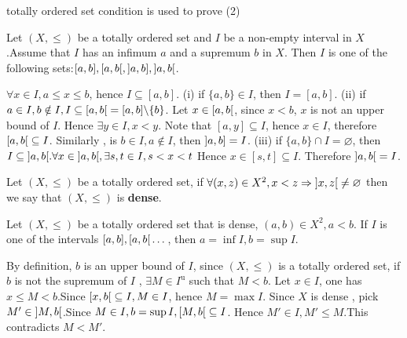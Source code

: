 \begin{remark}
    totally ordered set condition is used to prove (2)
\end{remark}
\begin{propositionenv}
   Let $(X, \le )$ be a totally ordered set and $I $ be a  non-empty interval in $X$  .Assume that $I$ has an infimum $a$ and a supremum $b$ in $X$. Then $I$ is one of the following sets:$[a, b], \interval[open right]{a}{b}, \interval[open left]{a}{b}, \interval[open]{a}{b}$.
\end{propositionenv}
\begin{proofenv}
    $\forall x\in I , a\le x\le b $, hence $I\subseteq [a, b]$.
    \newline
    (i) if $\{a, b\}\in I$,  then $I=[a, b]$.
    \newline
    (ii) if $a\in I,  b\notin I, I\subseteq\interval[open right]{a}{b}=[a, b]\backslash\{b\}$. Let $x\in \interval[open right]{a}{b}$,  since $x<b$,  $x$ is not an upper bound of $I$. Hence $\exists y\in I,  x<y$. Note that $[a, y]\subseteq I$,  hence $x\in I$,  therefore $\interval[open right]{a}{b}\subseteq I$. Similarly ,  is $b\in I, a\notin I$,  then $\interval[open left]{a}{b}=I$.
    \newline
    (iii) if $\{a, b\}\cap I=\varnothing$,  then $I\subseteq\interval[open]{a}{b} .\forall x\in \interval[open]{a}{b}, \exists s, t\in I, s<x<t$ Hence $x\in [s, t]\subseteq I$. Therefore $\interval[open]{a}{b}=I$.

\end{proofenv}
\begin{definitionenv}[Dense]
    Let $(X, \le )$ be a totally ordered set,  if $\forall (x, z)\in X^2, x<z\Rightarrow \interval[open]{x}{z}\not=\varnothing$ then we say that $(X, \le)$ is \textbf{dense}.
\end{definitionenv}
\begin{propositionenv}
    Let $(X, \le )$ be a totally ordered set that is dense,  $(a, b)\in X^2, a<b$. If $I$ is one of the intervals $[a, b], \interval[open right]{a}{b}\dots$,  then $a=\inf I, b=\sup I$.
\end{propositionenv}
\begin{proofenv}
    By definition,  $b$ is an upper bound of $I$,  since $(X, \le)$ is a totally ordered set, if $b$ is not the supremum of $I$ ,  $\exists M\in I^\mathrm{u}$ such that $M<b$.
    Let $x\in I$, one has $x\le M <b$.Since $\interval[open right]{x}{b}\subseteq I, M\in I$,  hence $M=\max I$. Since $X$ is dense , pick $M'\in \interval[open]{M}{b}$.Since $M\in I, b=\sup I, \interval[open right]{M}{b}\subseteq I$. Hence $M'\in I, M'\le M$.This contradicts $M<M'$.
\end{proofenv}



